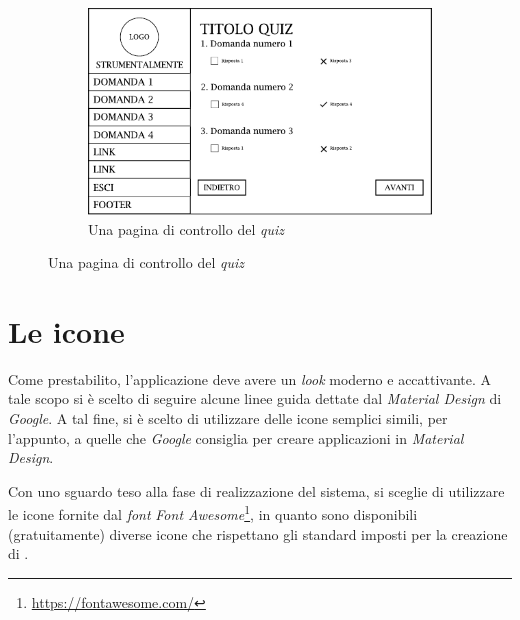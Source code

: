 \begin{figure}[H]\ContinuedFloat
	\begin{subfigure}[t]{\textwidth}
		\centering
		\includegraphics[width=\textwidth]{gabbie_logiche/Controlla_Quiz}
		\caption{Una pagina di controllo del \emph{quiz}}
	\end{subfigure}
\end{figure}

\section{Le icone}

Come prestabilito, l'applicazione deve avere un \emph{look} moderno e accattivante. A tale scopo si è scelto di seguire alcune linee guida dettate dal \emph{Material Design} di \emph{Google}. A tal fine, si è scelto di utilizzare delle icone semplici simili, per l'appunto, a quelle che \emph{Google} consiglia per creare applicazioni in \emph{Material Design}. 

Con uno sguardo teso alla fase di realizzazione del sistema, si sceglie di utilizzare le icone fornite dal \emph{font} \emph{Font Awesome}\footnote{\url{https://fontawesome.com/}}, in quanto sono disponibili (gratuitamente) diverse icone che rispettano gli standard imposti per la creazione di \ProjectTitle{}.